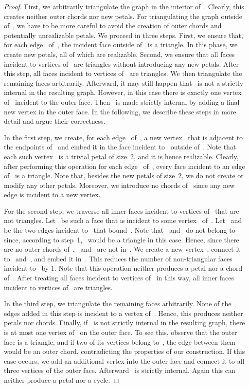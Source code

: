 \documentclass{llncs}
\begin{document}
\begin{proof}
    First, we arbitrarily triangulate the graph in the interior
    of~.  Clearly, this creates neither outer chords nor new
    petals.  For triangulating the graph outside of~, we have to be
    more careful to avoid the creation of outer chords and potentially
    unrealizable petals.  We proceed in three steps.  First, we ensure
    that, for each edge~ of~, the incident face outside of~
    is a triangle.  In this phase, we create new petals, all of which
    are realizable.  Second, we ensure that all faces incident to
    vertices of~ are triangles without introducing any new petals.
    After this step, all faces incident to vertices of~ are
    triangles.  We then triangulate the remaining faces arbitrarily.
    Afterward, it may still happen that~ is not a strictly
    internal in the resulting graph.  However, in this case there is
    exactly one vertex of~ incident to the outer face.  Then~ is
    made strictly internal by adding a final new vertex in the outer
    face.  In the following, we describe these steps in more detail
    and argue their correctness.

    In the first step, we create, for each edge~ of~, a new
    vertex~ that is adjacent to the endpoints of~ and embed it
    in the face incident to~ outside of~.  Note that each such
    vertex~ is a trivial petal of size~2, and it is hence
    realizable.  Clearly, after performing this operation for each
    edge~ of~, every face incident to an edge of~ is a
    triangle.  Note that, besides the new petals of size~2, we do not
    create or modify any other petals.  Moreover, we introduce no
    chords of~ since any new edge is incident to a new vertex.

    For the second step, we traverse all inner faces incident to
    vertices of~ that are not triangles.  Let~ be such a face
    that is incident to some vertex~ of~.  Let~ and~ be
    the two edges incident to~ that bound~.  Note that~
    and~ do not belong to~ since, according to step~1,~
    would be a triangle in this case.  Hence, since there are no
    outer chords of~,~ and~ are not in~.  We create a new
    vertex~, connect it to~ and~, and embed it in~.
    This reduces the number of non-triangular faces incident to~ by
    1.  Note that this operation neither produces a petal nor a chord
    of~.  After treating all faces incident to vertices of~ in
    this way, all inner faces incident to vertices of~ are
    triangles.
  
    In the third step, we triangulate the remaining faces arbitrarily.
    None of the edges added in this step is incident to a vertex
    of~.  Hence, this produces neither petals nor chords.  Finally,
    if~ is not strictly internal in the resulting graph, there is
    at most one vertex of~ on the outer face.  To see this, observe
    that the outer face is a triangle, and if two of its vertices
    belong to~, the edge between them would be an outer chord,
    contradicting the properties of our construction.  If this case
    occurs, we add an additional vertex into the outer face and
    connect it to all three vertices of the outer face.
    Afterward~ is strictly internal.  Again this can neither
    produce a petal nor a cycle.


\end{proof}
\end{document}
